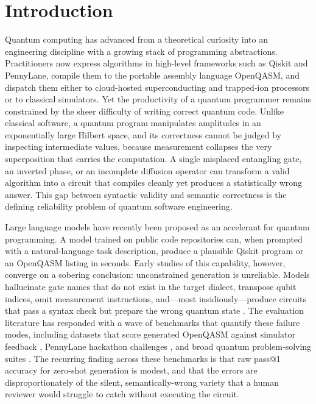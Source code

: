 \documentclass[11pt,a4paper]{article}
\newcounter{algo}
\begin{document}
\section{Introduction}
\label{sec:intro}

Quantum computing has advanced from a theoretical curiosity into an engineering discipline with a growing stack of programming abstractions. Practitioners now express algorithms in high-level frameworks such as Qiskit and PennyLane, compile them to the portable assembly language OpenQASM, and dispatch them either to cloud-hosted superconducting and trapped-ion processors or to classical simulators. Yet the productivity of a quantum programmer remains constrained by the sheer difficulty of writing correct quantum code. Unlike classical software, a quantum program manipulates amplitudes in an exponentially large Hilbert space, and its correctness cannot be judged by inspecting intermediate values, because measurement collapses the very superposition that carries the computation. A single misplaced entangling gate, an inverted phase, or an incomplete diffusion operator can transform a valid algorithm into a circuit that compiles cleanly yet produces a statistically wrong answer. This gap between syntactic validity and semantic correctness is the defining reliability problem of quantum software engineering.

Large language models have recently been proposed as an accelerant for quantum programming. A model trained on public code repositories can, when prompted with a natural-language task description, produce a plausible Qiskit program or an OpenQASM listing in seconds. Early studies of this capability, however, converge on a sobering conclusion: unconstrained generation is unreliable. Models hallucinate gate names that do not exist in the target dialect, transpose qubit indices, omit measurement instructions, and---most insidiously---produce circuits that pass a syntax check but prepare the wrong quantum state \cite{ref22,ref29,ref30}. The evaluation literature has responded with a wave of benchmarks that quantify these failure modes, including datasets that score generated OpenQASM against simulator feedback \cite{ref21,ref20}, PennyLane hackathon challenges \cite{ref30}, and broad quantum problem-solving suites \cite{ref20,ref22}. The recurring finding across these benchmarks is that raw pass@1 accuracy for zero-shot generation is modest, and that the errors are disproportionately of the silent, semantically-wrong variety that a human reviewer would struggle to catch without executing the circuit.
\end{document}
